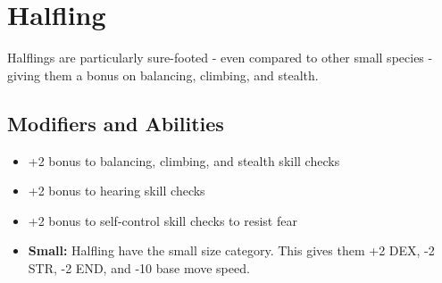 \section{Halfling}\label{halfling}
Halflings are particularly sure-footed - even compared to other small species -
giving them a bonus on balancing, climbing, and stealth.

\subsection*{Modifiers and Abilities}
\begin{itemize}
    \item +2 bonus to balancing, climbing, and stealth skill checks
    \item +2 bonus to hearing skill checks
    \item +2 bonus to self-control skill checks to resist fear
    \item \textbf{Small:} Halfling have the small size category. This gives
        them +2 DEX, -2 STR, -2 END, and -10 base move speed.
\end{itemize}
